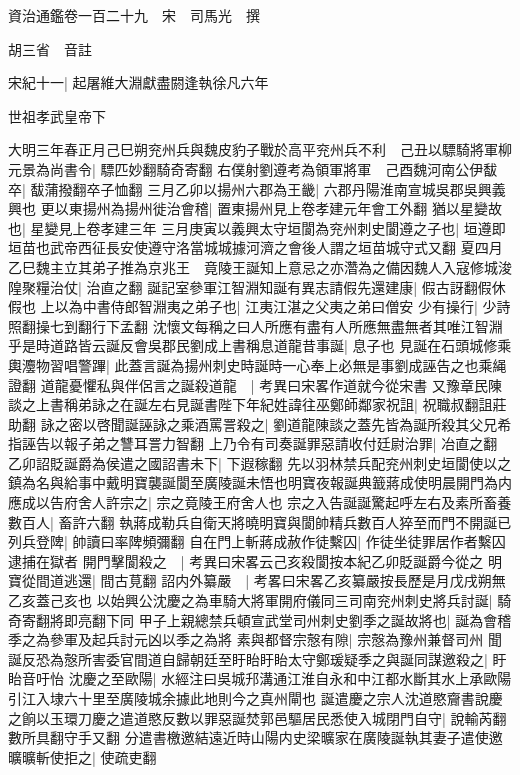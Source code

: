 資治通鑑卷一百二十九　宋　司馬光　撰

胡三省　音註

宋紀十一|{
	起屠維大淵獻盡閼逢執徐凡六年}


世祖孝武皇帝下

大明三年春正月己巳朔兖州兵與魏皮豹子戰於高平兖州兵不利　己丑以驃騎將軍柳元景為尚書令|{
	驃匹妙翻騎奇寄翻}
右僕射劉遵考為領軍將軍　己酉魏河南公伊馛卒|{
	馛蒲撥翻卒子恤翻}
三月乙卯以揚州六郡為王畿|{
	六郡丹陽淮南宣城吳郡吳興義興也}
更以東揚州為揚州徙治會稽|{
	置東揚州見上卷孝建元年會工外翻}
猶以星變故也|{
	星變見上卷孝建三年}
三月庚寅以義興太守垣閬為兖州刺史閬遵之子也|{
	垣遵即垣苗也武帝西征長安使遵守洛當城城據河濟之會後人謂之垣苗城守式又翻}
夏四月乙巳魏主立其弟子推為京兆王　竟陵王誕知上意忌之亦濳為之備因魏人入寇修城浚隍聚糧治仗|{
	治直之翻}
誕記室參軍江智淵知誕有異志請假先還建康|{
	假古訝翻假休假也}
上以為中書侍郎智淵夷之弟子也|{
	江夷江湛之父夷之弟曰僧安}
少有操行|{
	少詩照翻操七到翻行下孟翻}
沈懷文每稱之曰人所應有盡有人所應無盡無者其唯江智淵乎是時道路皆云誕反會吳郡民劉成上書稱息道龍昔事誕|{
	息子也}
見誕在石頭城修乘輿灋物習唱警蹕|{
	此蓋言誕為揚州刺史時誕時一心奉上必無是事劉成誣告之也乘䋲證翻}
道龍憂懼私與伴侶言之誕殺道龍　|{
	考異曰宋畧作道就今從宋書}
又豫章民陳談之上書稱弟詠之在誕左右見誕書陛下年紀姓諱往巫鄭師鄰家祝詛|{
	祝職叔翻詛莊助翻}
詠之密以啓聞誕誣詠之乘酒罵詈殺之|{
	劉道龍陳談之蓋先皆為誕所殺其父兄希指誣告以報子弟之讐耳詈力智翻}
上乃令有司奏誕罪惡請收付廷尉治罪|{
	冶直之翻}
乙卯詔貶誕爵為侯遣之國詔書未下|{
	下遐稼翻}
先以羽林禁兵配兖州刺史垣閬使以之鎮為名與給事中戴明寶襲誕閬至廣陵誕未悟也明寶夜報誕典籖蔣成使明晨開門為内應成以告府舍人許宗之|{
	宗之竟陵王府舍人也}
宗之入告誕誕驚起呼左右及素所畜養數百人|{
	畜許六翻}
執蔣成勒兵自衛天將曉明寶與閬帥精兵數百人猝至而門不開誕已列兵登陴|{
	帥讀曰率陴頻彌翻}
自在門上斬蔣成赦作徒繫囚|{
	作徒坐徒罪居作者繫囚逮捕在獄者}
開門擊閬殺之　|{
	考異曰宋畧云己亥殺閬按本紀乙卯貶誕爵今從之}
明寶從間道逃還|{
	間古莧翻}
詔内外纂嚴　|{
	考畧曰宋畧乙亥纂嚴按長歷是月戊戌朔無乙亥蓋己亥也}
以始興公沈慶之為車騎大將軍開府儀同三司南兖州刺史將兵討誕|{
	騎奇寄翻將即亮翻下同}
甲子上親總禁兵頓宣武堂司州刺史劉季之誕故將也|{
	誕為會稽季之為參軍及起兵討元凶以季之為將}
素與都督宗慤有隙|{
	宗慤為豫州兼督司州}
聞誕反恐為慤所害委官間道自歸朝廷至盱眙盱眙太守鄭瑗疑季之與誕同謀邀殺之|{
	盱眙音吁怡}
沈慶之至歐陽|{
	水經注曰吳城䢴溝通江淮自永和中江都水斷其水上承歐陽引江入埭六十里至廣陵城余據此地則今之真州閘也}
誕遣慶之宗人沈道愍齎書說慶之餉以玉環刀慶之遣道愍反數以罪惡誕焚郭邑驅居民悉使入城閉門自守|{
	說輸芮翻數所具翻守手又翻}
分遣書檄邀結遠近時山陽内史梁曠家在廣陵誕執其妻子遣使邀曠曠斬使拒之|{
	使疏吏翻}
